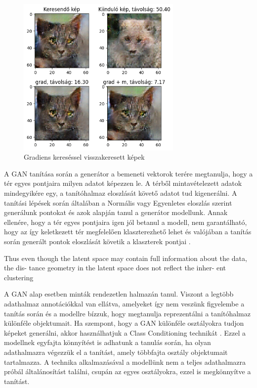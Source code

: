 \begin{figure}[h]
\centering
\includegraphics[width=8cm]{images/grad_found.png}
\caption{Gradiens kereséssel visszakeresett képek}
\label{fig:gradfound}
\end{figure}



A GAN tanítása során a generátor a bemeneti vektorok terére megtanulja, hogy a tér egyes pontjaira milyen adatot képezzen le. A térből mintavételezett adatok mindegyikére egy, a tanítóhalmaz eloszlását követő adatot tud kigenerálni.
A tanítási lépések során általában a Normális vagy Egyenletes eloszlás szerint generálunk pontokat és azok alapján tanul a generátor modellunk. Annak ellenére, hogy a tér egyes pontjaira igen jól betanul a modell, nem garantálható, hogy az így keletkezett tér megfelelően klaszterezhető lehet és valójában a tanítás során generált pontok eloszlását követik a klaszterek pontjai \cite{mukherjee2019clustergan}.

Thus even though the latent
space may contain full information about the data, the dis-
tance geometry in the latent space does not reflect the inher-
ent clustering


A GAN alap esetben minták rendezetlen halmazán tanul. Viszont a legtöbb adathalmaz annotációkkal van ellátva, amelyeket így nem veszünk figyelembe a tanítás során és a modellre bízzuk, hogy megtanulja reprezentálni a tanítóhalmaz különféle objektumait. Ha szempont, hogy a GAN különféle osztályokra tudjon képeket generálni, akkor használhatjuk a Class Conditioning technikát \cite{mirza2014conditional}. Ezzel a modellnek egyfajta könnyítést is adhatunk a tanulás során, ha olyan adathalmazra végezzük el a tanítást, amely többfajta osztály objektumait tartalmazza. A technika alkalmazásával a modellünk nem a teljes adathalmazra próbál általánosítást találni, csupán az egyes osztályokra, ezzel is megkönnyítve a tanítást.

